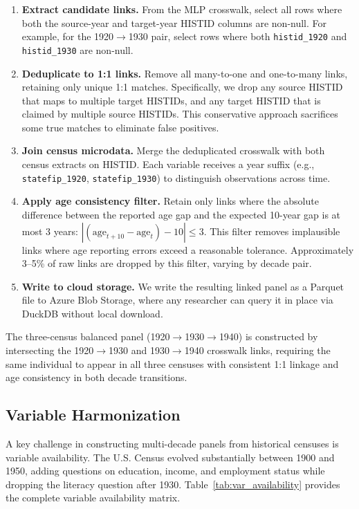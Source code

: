 \documentclass[12pt]{article}
\begin{document}
\begin{enumerate}
\item \textbf{Extract candidate links.} From the MLP crosswalk, select all rows where both the source-year and target-year HISTID columns are non-null. For example, for the 1920$\rightarrow$1930 pair, select rows where both \texttt{histid\_1920} and \texttt{histid\_1930} are non-null.

\item \textbf{Deduplicate to 1:1 links.} Remove all many-to-one and one-to-many links, retaining only unique 1:1 matches. Specifically, we drop any source HISTID that maps to multiple target HISTIDs, and any target HISTID that is claimed by multiple source HISTIDs. This conservative approach sacrifices some true matches to eliminate false positives.

\item \textbf{Join census microdata.} Merge the deduplicated crosswalk with both census extracts on HISTID. Each variable receives a year suffix (e.g., \texttt{statefip\_1920}, \texttt{statefip\_1930}) to distinguish observations across time.

\item \textbf{Apply age consistency filter.} Retain only links where the absolute difference between the reported age gap and the expected 10-year gap is at most 3 years: $|(\text{age}_{t+10} - \text{age}_t) - 10| \leq 3$. This filter removes implausible links where age reporting errors exceed a reasonable tolerance. Approximately 3--5\% of raw links are dropped by this filter, varying by decade pair.

\item \textbf{Write to cloud storage.} We write the resulting linked panel as a Parquet file to Azure Blob Storage, where any researcher can query it in place via DuckDB without local download.
\end{enumerate}

The three-census balanced panel (1920$\rightarrow$1930$\rightarrow$1940) is constructed by intersecting the 1920$\rightarrow$1930 and 1930$\rightarrow$1940 crosswalk links, requiring the same individual to appear in all three censuses with consistent 1:1 linkage and age consistency in both decade transitions.

\subsection{Variable Harmonization}

A key challenge in constructing multi-decade panels from historical censuses is variable availability. The U.S. Census evolved substantially between 1900 and 1950, adding questions on education, income, and employment status while dropping the literacy question after 1930. Table~\ref{tab:var_availability} provides the complete variable availability matrix.
\end{document}
